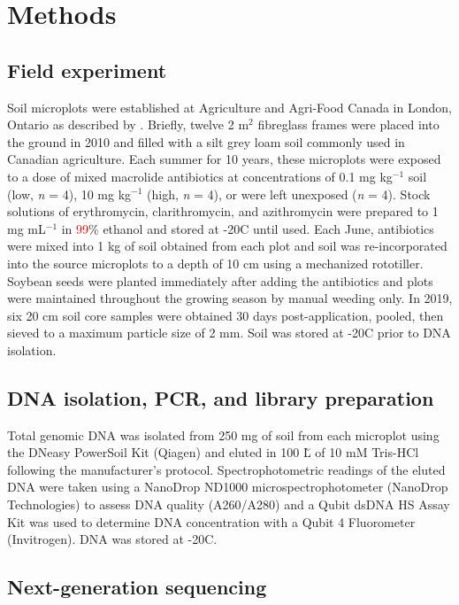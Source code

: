 \chapter{Methods}

\section{Field experiment}

Soil microplots were established at Agriculture and Agri-Food Canada in London, Ontario as described by \parencite{Topp.2016}.
Briefly, twelve 2 m$^{2}$ fibreglass frames were placed into the ground in 2010 and filled with a silt grey loam soil commonly used in Canadian agriculture.
Each summer for 10 years, these microplots were exposed to a dose of mixed macrolide antibiotics at concentrations of 0.1 mg kg$^{-1}$ soil (low, \textit{n} = 4), 10 mg kg$^{-1}$ (high, \textit{n} = 4), or were left unexposed (\textit{n} = 4).
Stock solutions of erythromycin, clarithromycin, and azithromycin were prepared to 1 mg mL$^{-1}$ in \textcolor{red}{99}\% ethanol and stored at -20\degree C until used.
Each June, antibiotics were mixed into 1 kg of soil obtained from each plot and soil was re-incorporated into the source microplots to a depth of 10 cm using a mechanized rototiller.
Soybean seeds were planted immediately after adding the antibiotics and plots were maintained throughout the growing season by manual weeding only.
In 2019, six 20 cm soil core samples were obtained 30 days post-application, pooled, then sieved to a maximum particle size of 2 mm. Soil was stored at -20\degree C prior to DNA isolation.

\section{DNA isolation, PCR, and library preparation}

Total genomic DNA was isolated from 250 mg of soil from each microplot using the DNeasy PowerSoil Kit (Qiagen) and eluted in 100 \u L of 10 mM Tris-HCl following the manufacturer’s protocol. Spectrophotometric readings of the eluted DNA were taken using a NanoDrop ND1000 microspectrophotometer (NanoDrop Technologies) to assess DNA quality (A260/A280) and a Qubit\textsuperscript{\texttrademark{}} dsDNA HS Assay Kit was used to determine DNA concentration with a Qubit\textsuperscript{\texttrademark{}} 4 Fluorometer (Invitrogen).
DNA was stored at -20\degree C.

\section{Next-generation sequencing}

